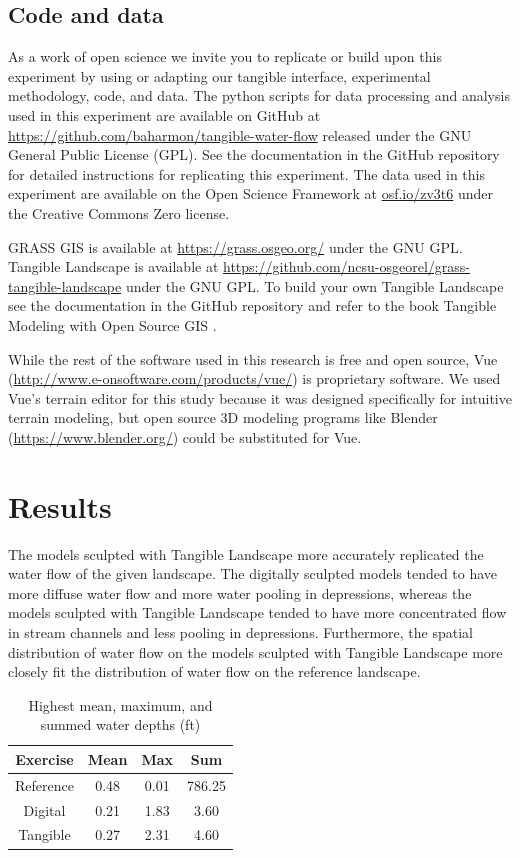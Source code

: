 \documentclass{isprs}
\begin{document}
\subsection{Code and data}

As a work of open science we invite you to
replicate or build upon this experiment by 
using or adapting our tangible interface, experimental methodology, code, and data. 
%
The python scripts for data processing and analysis used in this experiment 
are available on GitHub at \url{https://github.com/baharmon/tangible-water-flow}
released under the GNU General Public License (GPL). 
%
See the documentation in the GitHub repository for detailed instructions for replicating this experiment. 
%
The data used in this experiment are available on the Open Science Framework at \url{osf.io/zv3t6} under the Creative Commons Zero license.

GRASS GIS is available at
\url{https://grass.osgeo.org/} 
under the GNU GPL. 
%
Tangible Landscape is available at
\url{https://github.com/ncsu-osgeorel/grass-tangible-landscape}
under the GNU GPL. 
%
To build your own Tangible Landscape
see the documentation in the GitHub repository 
and refer to the book Tangible Modeling with Open Source GIS \cite{Petrasova2015}.

While the rest of the software used in this research is free and open source, 
Vue (\url{http://www.e-onsoftware.com/products/vue/}) is proprietary software. 
We used Vue's terrain editor for this study because it was designed specifically for intuitive terrain modeling, but 
open source 3D modeling programs like Blender (\url{https://www.blender.org/}) could be substituted for Vue. 
%

\section{Results}\label{sec:results}
%
The models sculpted with Tangible Landscape more accurately replicated the water flow of the given landscape. 
%
The digitally sculpted models tended to have 
more diffuse water flow
and more water pooling in depressions, whereas 
%
the models sculpted with Tangible Landscape tended to have 
more concentrated flow in stream channels
and less pooling in depressions.
%
Furthermore, 
the spatial distribution of water flow on the models sculpted with Tangible Landscape 
more closely fit the distribution of water flow on the reference landscape. 

\begin{table}[h!]
\caption{Highest mean, maximum, and summed water depths (ft)}
\vspace*{0.5em}
\centering
\begin{tabular}{c | c c c}
Exercise & Mean & Max & Sum\\
\hline
Reference & 0.48 & 0.01 & 786.25\\
Digital & 0.21 & 1.83 & 3.60\\
Tangible & 0.27 & 2.31 & 4.60\\ 
\end{tabular}
\label{table:water_depth} 
\end{table}
\end{document}
